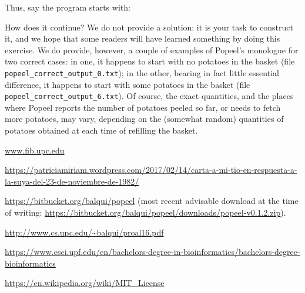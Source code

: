 \documentclass[12pt]{article}
\begin{document}
Thus, say the program starts with:




How does it continue? We do not provide a solution:
it is your task to construct it, and we hope that
some readers will have learned something by doing
this exercise. We do provide, however, a couple of
examples of Popeel's monologue for two correct cases:
in one, it happens to start with no potatoes in the
basket (file {\tt popeel_correct_output_0.txt});
in the other, bearing in fact little essential difference,
it happens to start with some potatoes 
in the
basket (file {\tt popeel_correct_output_6.txt}).
Of course, the exact quantities, and the places where
Popeel reports the number of potatoes peeled so far,
or needs to fetch more potatoes,
may vary, depending on the (somewhat random) 
quantities of potatoes
obtained at each time of refilling the basket.

\begin{thebibliography}{10}

\url{www.fib.upc.edu}

\url{https://patriciamiriam.wordpress.com/2017/02/14/carta-a-mi-tio-en-respuesta-a-la-suya-del-23-de-noviembre-de-1982/}

\url{https://bitbucket.org/balqui/popeel} (most recent advisable download
at the time of writing: \url{https://bitbucket.org/balqui/popeel/downloads/popeel-v0.1.2.zip}).

\url{http://www.cs.upc.edu/~balqui/proal16.pdf}

\url{https://www.esci.upf.edu/en/bachelors-degree-in-bioinformatics/bachelors-degree-bioinformatics}

\url{https://en.wikipedia.org/wiki/MIT_License}

\end{thebibliography}
\end{document}
